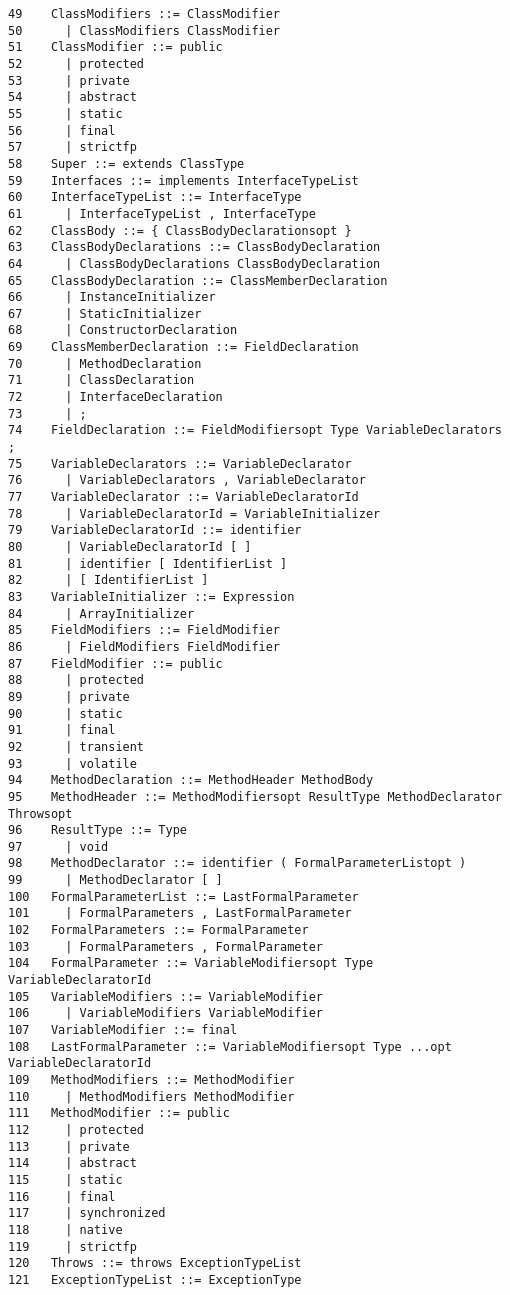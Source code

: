 {\begin{verbatim}
49    ClassModifiers ::= ClassModifier
50      | ClassModifiers ClassModifier
51    ClassModifier ::= public
52      | protected
53      | private
54      | abstract
55      | static
56      | final
57      | strictfp
58    Super ::= extends ClassType
59    Interfaces ::= implements InterfaceTypeList
60    InterfaceTypeList ::= InterfaceType
61      | InterfaceTypeList , InterfaceType
62    ClassBody ::= { ClassBodyDeclarationsopt }
63    ClassBodyDeclarations ::= ClassBodyDeclaration
64      | ClassBodyDeclarations ClassBodyDeclaration
65    ClassBodyDeclaration ::= ClassMemberDeclaration
66      | InstanceInitializer
67      | StaticInitializer
68      | ConstructorDeclaration
69    ClassMemberDeclaration ::= FieldDeclaration
70      | MethodDeclaration
71      | ClassDeclaration
72      | InterfaceDeclaration
73      | ;
74    FieldDeclaration ::= FieldModifiersopt Type VariableDeclarators ;
75    VariableDeclarators ::= VariableDeclarator
76      | VariableDeclarators , VariableDeclarator
77    VariableDeclarator ::= VariableDeclaratorId
78      | VariableDeclaratorId = VariableInitializer
79    VariableDeclaratorId ::= identifier
80      | VariableDeclaratorId [ ]
81      | identifier [ IdentifierList ]
82      | [ IdentifierList ]
83    VariableInitializer ::= Expression
84      | ArrayInitializer
85    FieldModifiers ::= FieldModifier
86      | FieldModifiers FieldModifier
87    FieldModifier ::= public
88      | protected
89      | private
90      | static
91      | final
92      | transient
93      | volatile
94    MethodDeclaration ::= MethodHeader MethodBody
95    MethodHeader ::= MethodModifiersopt ResultType MethodDeclarator Throwsopt
96    ResultType ::= Type
97      | void
98    MethodDeclarator ::= identifier ( FormalParameterListopt )
99      | MethodDeclarator [ ]
100   FormalParameterList ::= LastFormalParameter
101     | FormalParameters , LastFormalParameter
102   FormalParameters ::= FormalParameter
103     | FormalParameters , FormalParameter
104   FormalParameter ::= VariableModifiersopt Type VariableDeclaratorId
105   VariableModifiers ::= VariableModifier
106     | VariableModifiers VariableModifier
107   VariableModifier ::= final
108   LastFormalParameter ::= VariableModifiersopt Type ...opt VariableDeclaratorId
109   MethodModifiers ::= MethodModifier
110     | MethodModifiers MethodModifier
111   MethodModifier ::= public
112     | protected
113     | private
114     | abstract
115     | static
116     | final
117     | synchronized
118     | native
119     | strictfp
120   Throws ::= throws ExceptionTypeList
121   ExceptionTypeList ::= ExceptionType

\end{verbatim}}
